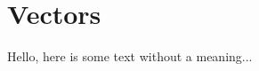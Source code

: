 \documentclass[../main.tex]{subfiles}
\begin{document}
\section{Vectors}

Hello, here is some text without a meaning...
\end{document}
